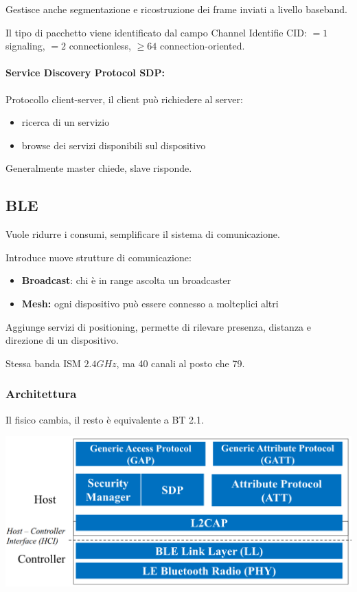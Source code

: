 Gestisce anche segmentazione e ricostruzione dei frame inviati a livello baseband.

Il tipo di pacchetto viene identificato dal campo Channel Identifie CID: $=1$ signaling, $=2$ connectionless, $\geq 64$ connection-oriented.

\paragraph{Service Discovery Protocol SDP:} Protocollo client-server, il client può richiedere al server: 
\begin{itemize}
    \item ricerca di un servizio
    
    \item browse dei servizi disponibili sul dispositivo
\end{itemize}
Generalmente master chiede, slave risponde.

\subsection{BLE}

Vuole ridurre i consumi, semplificare il sistema di comunicazione.

Introduce nuove strutture di comunicazione: 
\begin{itemize}
    \item \textbf{Broadcast}: chi è in range ascolta un broadcaster
    
    \item \textbf{Mesh:} ogni dispositivo può essere connesso a molteplici altri
\end{itemize}

Aggiunge servizi di positioning, permette di rilevare presenza, distanza e direzione di un dispositivo.

Stessa banda ISM $2.4GHz$, ma 40 canali al posto che 79.

\subsubsection{Architettura}

Il fisico cambia, il resto è equivalente a BT 2.1.
\begin{center}
    \includegraphics[width=0.7\linewidth]{../img/wpan/blearch}
\end{center}

